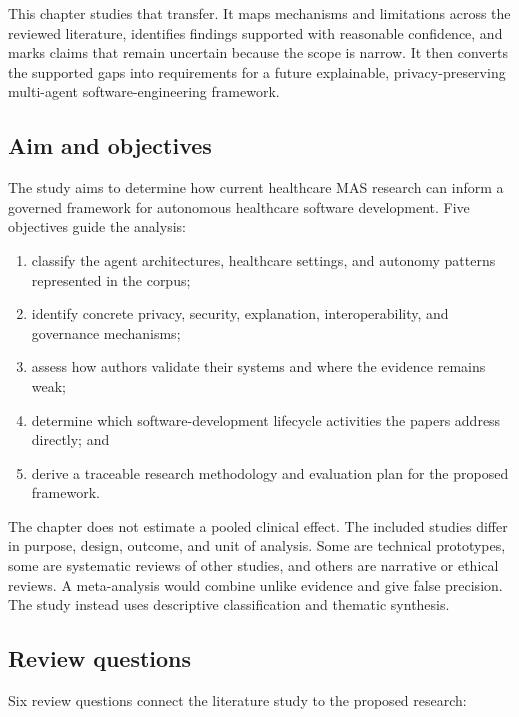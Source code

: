 \documentclass[11pt,a4paper]{article}
\begin{document}
This chapter studies that transfer. It maps mechanisms and limitations across the reviewed literature, identifies findings supported with reasonable confidence, and marks claims that remain uncertain because the scope is narrow. It then converts the supported gaps into requirements for a future explainable, privacy-preserving multi-agent software-engineering framework.

\subsection{Aim and objectives}

The study aims to determine how current healthcare MAS research can inform a governed framework for autonomous healthcare software development. Five objectives guide the analysis:

\begin{enumerate}
  \item classify the agent architectures, healthcare settings, and autonomy patterns represented in the corpus;
  \item identify concrete privacy, security, explanation, interoperability, and governance mechanisms;
  \item assess how authors validate their systems and where the evidence remains weak;
  \item determine which software-development lifecycle activities the papers address directly; and
  \item derive a traceable research methodology and evaluation plan for the proposed framework.
\end{enumerate}

The chapter does not estimate a pooled clinical effect. The included studies differ in purpose, design, outcome, and unit of analysis. Some are technical prototypes, some are systematic reviews of other studies, and others are narrative or ethical reviews. A meta-analysis would combine unlike evidence and give false precision. The study instead uses descriptive classification and thematic synthesis.

\subsection{Review questions}

Six review questions connect the literature study to the proposed research:
\end{document}
